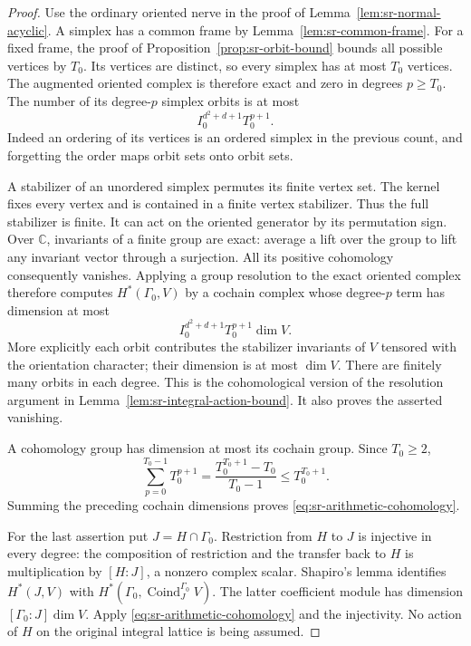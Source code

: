 \begin{proof}
Use the ordinary oriented nerve in the proof of
Lemma~\ref{lem:sr-normal-acyclic}.
A simplex has a common frame by Lemma~\ref{lem:sr-common-frame}.
For a fixed frame, the proof of Proposition~\ref{prop:sr-orbit-bound}
bounds all possible vertices by \(T_0\).
Its vertices are distinct, so every simplex has at most \(T_0\)
vertices. The augmented oriented complex is therefore exact and
zero in degrees \(p\geq T_0\).
The number of its degree-\(p\) simplex orbits is at most
\[
               I_0^{d^2+d+1}T_0^{p+1}.
\]
Indeed an ordering of its vertices is an ordered simplex in the
previous count, and forgetting the order maps orbit sets onto orbit
sets.

A stabilizer of an unordered simplex permutes its finite vertex set.
The kernel fixes every vertex and is contained in a finite vertex
stabilizer. Thus the full stabilizer is finite.
It can act on the oriented generator by its permutation sign.
Over \(\mathbb C\), invariants of a finite group are exact: average
a lift over the group to lift any invariant vector through a
surjection. All its positive cohomology consequently vanishes.
Applying a group resolution to the exact oriented complex therefore
computes \(H^*(\Gamma_0,V)\) by a cochain complex whose degree-\(p\)
term has dimension at most
\[
           I_0^{d^2+d+1}T_0^{p+1}\dim V.
\]
More explicitly each orbit contributes the stabilizer invariants of
\(V\) tensored with the orientation character; their dimension is
at most \(\dim V\).
There are finitely many orbits in each degree.
This is the cohomological version of the resolution argument in
Lemma~\ref{lem:sr-integral-action-bound}.
It also proves the asserted vanishing.

A cohomology group has dimension at most its cochain group.
Since \(T_0\geq2\),
\[
 \sum_{p=0}^{T_0-1}T_0^{p+1}
       =\frac{T_0^{T_0+1}-T_0}{T_0-1}
       \leq T_0^{T_0+1}.
\]
Summing the preceding cochain dimensions proves
\eqref{eq:sr-arithmetic-cohomology}.

For the last assertion put \(J=H\cap\Gamma_0\).
Restriction from \(H\) to \(J\) is injective in every degree:
the composition of restriction and the transfer back to \(H\)
is multiplication by \([H:J]\), a nonzero complex scalar.
Shapiro's lemma identifies \(H^*(J,V)\) with
\(H^*(\Gamma_0,\operatorname{Coind}_J^{\Gamma_0}V)\).
The latter coefficient module has dimension
\([\Gamma_0:J]\dim V\).
Apply \eqref{eq:sr-arithmetic-cohomology} and the injectivity.
No action of \(H\) on the original integral lattice is being assumed.
\end{proof}

